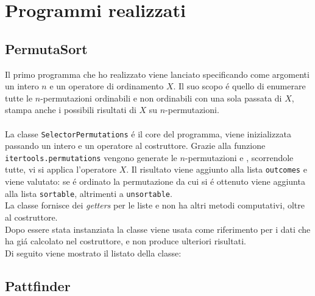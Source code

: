 \chapter{Programmi realizzati}
\section*{PermutaSort}
Il primo programma che ho realizzato viene lanciato specificando come argomenti un intero $n$ e un operatore di ordinamento $X$. Il suo scopo \'e quello di enumerare tutte le $n$-permutazioni ordinabili e non ordinabili con una sola passata di $X$, stampa anche i possibili risultati di $X$ su $n$-permutazioni.\\\\
La classe \texttt{SelectorPermutations} \'e il core del programma, viene inizializzata passando un intero e un operatore al costruttore. Grazie alla funzione \texttt{itertools.permutations} vengono generate le $n$-permutazioni e , scorrendole tutte, vi si applica l'operatore $X$. Il risultato viene aggiunto alla lista \texttt{outcomes} e viene valutato: se \'e ordinato la permutazione da cui si \'e ottenuto viene aggiunta alla lista \texttt{sortable}, altrimenti a \texttt{unsortable}.\\La classe fornisce dei \textit{getters} per le liste e non ha altri metodi computativi, oltre al costruttore.\\
Dopo essere stata instanziata la classe viene usata come riferimento per i dati che ha gi\'a calcolato nel costruttore, e non produce ulteriori risultati.\\Di seguito viene mostrato il listato della classe:
\\
\pagebreak
\section*{Pattfinder}